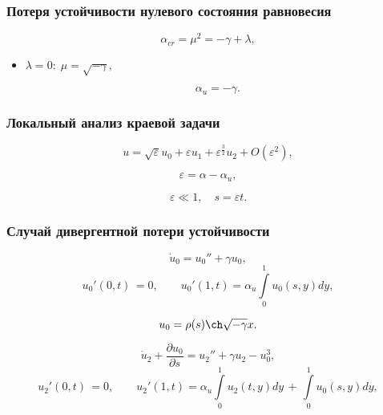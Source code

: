 \documentclass[fullscreen=true, unicode, bookmarks=false]{beamer}
\begin{document}
\begin{frame}
\frametitle{ Потеря устойчивости нулевого состояния равновесия }
 
\begin{equation}
	\alpha_{cr} = \mu^2 = -\gamma + \lambda,
\end{equation}

\bigskip

\begin{itemize}

\item { $ \lambda = 0: \; \mu = \sqrt{-\gamma}, $ 
}

\begin{equation}
	\alpha_u = -\gamma.
\end{equation}

\end{itemize}	

\end{frame}

\begin{frame}
\frametitle{ Локальный анализ краевой задачи }

\begin{equation}
	u = \sqrt{\varepsilon}u_0 + \varepsilon u_1 + \varepsilon^{\frac{3}{2}} u_2 + O(\varepsilon^2),
\end{equation}

\bigskip

$$ \varepsilon = \alpha - \alpha_u, $$

$$ \varepsilon \ll 1, \quad s = \varepsilon t. $$

\end{frame}

\begin{frame}
\frametitle{ Случай дивергентной потери устойчивости }

\begin{equation}
	\dot u_0 = u_0'' + \gamma u_0,
\end{equation}
\begin{equation}
	u_0'(0, t) \, = 0, \qquad u_0'(1, t) = \alpha_u\int\limits_{0}^{1} u_0(s, y) dy,
\end{equation}

$$ u_0 = \rho(s) \ch \sqrt{-\gamma} x. $$

\bigskip

\begin{equation}
	\dot u_2 + \frac{\partial u_0}{\partial s} = u_2'' + \gamma u_2 - u_0^3,
\end{equation}
\begin{equation}
	u_2'(0, t) \, = 0, \qquad u_2'(1, t) = \alpha_u\int\limits_{0}^{1} u_2(t, y) dy \, + \, \int\limits_{0}^{1} u_0(s, y) dy,
\end{equation}

\end{frame}
\end{document}
